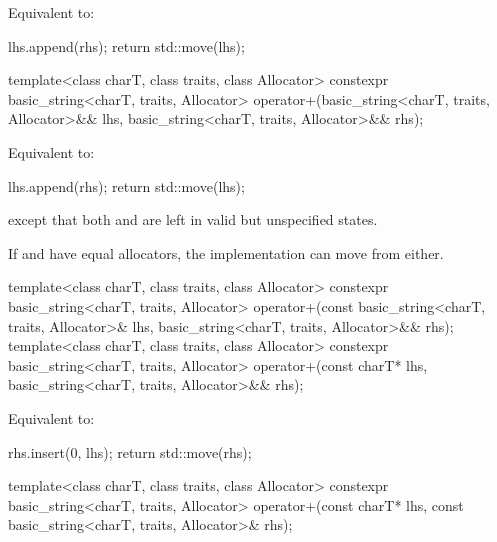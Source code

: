 \begin{itemdescr}
\pnum
\effects
Equivalent to:
\begin{codeblock}
lhs.append(rhs);
return std::move(lhs);
\end{codeblock}
\end{itemdescr}

%
\begin{itemdecl}
template<class charT, class traits, class Allocator>
  constexpr basic_string<charT, traits, Allocator>
    operator+(basic_string<charT, traits, Allocator>&& lhs,
              basic_string<charT, traits, Allocator>&& rhs);
\end{itemdecl}

\begin{itemdescr}
\pnum
\effects
Equivalent to:
\begin{codeblock}
lhs.append(rhs);
return std::move(lhs);
\end{codeblock}
except that both  and 
are left in valid but unspecified states.
\begin{note}
If  and  have equal allocators,
the implementation can move from either.
\end{note}
\end{itemdescr}

%
\begin{itemdecl}
template<class charT, class traits, class Allocator>
  constexpr basic_string<charT, traits, Allocator>
    operator+(const basic_string<charT, traits, Allocator>& lhs,
              basic_string<charT, traits, Allocator>&& rhs);
template<class charT, class traits, class Allocator>
  constexpr basic_string<charT, traits, Allocator>
    operator+(const charT* lhs, basic_string<charT, traits, Allocator>&& rhs);
\end{itemdecl}

\begin{itemdescr}
\pnum
\effects
Equivalent to:
\begin{codeblock}
rhs.insert(0, lhs);
return std::move(rhs);
\end{codeblock}
\end{itemdescr}

%
\begin{itemdecl}
template<class charT, class traits, class Allocator>
  constexpr basic_string<charT, traits, Allocator>
    operator+(const charT* lhs, const basic_string<charT, traits, Allocator>& rhs);
\end{itemdecl}

